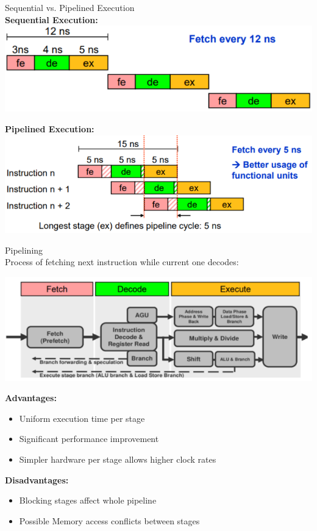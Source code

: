 \begin{concept}{Sequential vs. Pipelined Execution}\\
\textbf{Sequential Execution:}\\
\includegraphics[width=\linewidth]{images/sequentialexec.png}

\textbf{Pipelined Execution:}\\
\includegraphics[width=\linewidth]{images/pipelinedexec.png}
\end{concept}

\begin{definition}{Pipelining}\\
Process of fetching next instruction while current one decodes:

\includegraphics[width=\linewidth]{images/fetchwhiledecode.png}

\textbf{Advantages:}
\begin{itemize}
  \item Uniform execution time per stage
  \item Significant performance improvement
  \item Simpler hardware per stage allows higher clock rates
\end{itemize}

\textbf{Disadvantages:}
\begin{itemize}
  \item Blocking stages affect whole pipeline
  \item Possible Memory access conflicts between stages
\end{itemize}
\end{definition}

